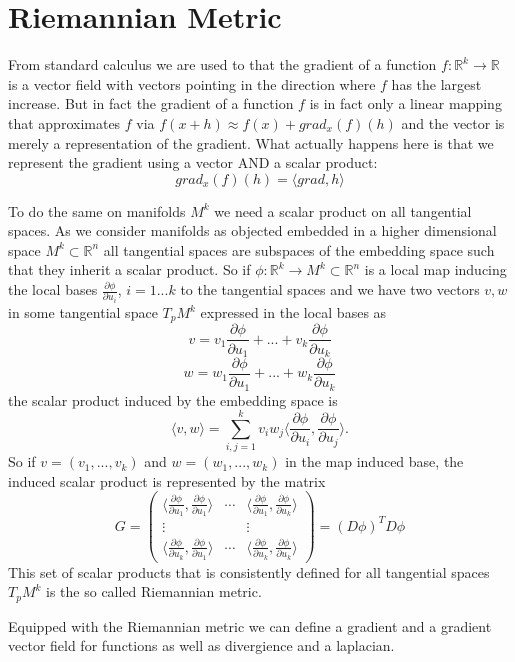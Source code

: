 \section{Riemannian Metric}
From standard calculus we are used to that the gradient of a function $f:\mathbb R^k \rightarrow \mathbb R$ is a vector field with vectors pointing in the direction where $f$ has the largest increase. But in fact the gradient of a function $f$ is in fact only a linear mapping that approximates $f$ via $f(x + h) \approx f(x) + grad_x(f) (h)$ and the vector is merely a representation of the gradient. What actually happens here is that we represent the gradient using a vector AND a scalar product:
\[grad_x(f) (h) = \langle grad, h\rangle\]

To do the same on manifolds $M^k$ we need a scalar product on all tangential spaces. As we consider manifolds as objected embedded in a higher dimensional space $M^k \subset \mathbb R^n$ all tangential spaces are subspaces of the embedding space such that they inherit a scalar product. So if $\phi: \mathbb R^k \rightarrow M^k \subset \mathbb R^n$ is a local map inducing the local bases $\frac{\partial \phi}{\partial u_i}$, $i= 1...k$ to the tangential spaces and we have two vectors $v, w$ in some tangential space $T_p M^k$ expressed in the local bases as
\[v= v_1 \frac{\partial \phi}{\partial u_1} +...+ v_k\frac{\partial \phi}{\partial u_k} \]
\[w = w_1 \frac{\partial \phi}{\partial u_1} +...+ w_k\frac{\partial \phi}{\partial u_k}\]
the scalar product induced by the embedding space is
\[\langle v,w \rangle = \sum_{i,j = 1}^k v_iw_j\langle \frac{\partial \phi}{\partial u_i},\frac{\partial \phi}{\partial u_j}\rangle.\]
So if $v = (v_1,...,v_k)$ and $w = (w_1,...,w_k)$ in the map induced base, the induced scalar product is represented by the matrix
\[G= \begin{pmatrix}\langle \frac{\partial \phi}{\partial u_1},\frac{\partial \phi}{\partial u_1}\rangle &\cdots& \langle \frac{\partial \phi}{\partial u_1},\frac{\partial \phi}{\partial u_k}\rangle \\
\vdots &&\vdots\\
\langle \frac{\partial \phi}{\partial u_k},\frac{\partial \phi}{\partial u_1}\rangle &\cdots& \langle \frac{\partial \phi}{\partial u_k},\frac{\partial \phi}{\partial u_k}\rangle \end{pmatrix} = (D\phi)^T D\phi\]
This set of scalar products that is consistently defined for all tangential spaces $T_p M^k$ is the so called Riemannian metric.

Equipped with the Riemannian metric we can define a gradient and a gradient vector field for functions as well as divergience and a laplacian. 

